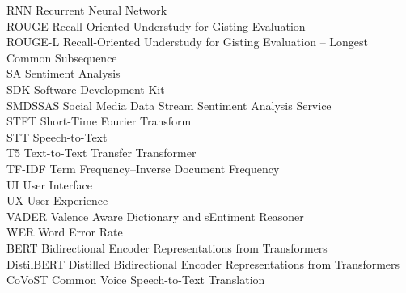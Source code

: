 \begin{tabbing}
RNN \> Recurrent Neural Network \\
ROUGE \> Recall-Oriented Understudy for Gisting Evaluation \\
ROUGE-L \> Recall-Oriented Understudy for Gisting Evaluation -- Longest Common Subsequence \\
SA \> Sentiment Analysis \\
SDK \> Software Development Kit \\
SMDSSAS \> Social Media Data Stream Sentiment Analysis Service \\
STFT \> Short-Time Fourier Transform \\
STT \> Speech-to-Text \\
T5 \> Text-to-Text Transfer Transformer \\
TF-IDF \> Term Frequency--Inverse Document Frequency \\
UI \> User Interface \\
UX \> User Experience \\
VADER \> Valence Aware Dictionary and sEntiment Reasoner \\
WER \> Word Error Rate \\
BERT \> Bidirectional Encoder Representations from Transformers \\
DistilBERT \> Distilled Bidirectional Encoder Representations from Transformers \\
CoVoST \> Common Voice Speech-to-Text Translation \\

\end{tabbing}

